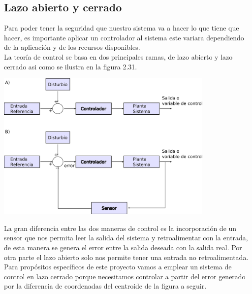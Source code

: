 
\subsection{Lazo abierto y cerrado}
Para poder tener la seguridad que nuestro sistema va a hacer lo que tiene que hacer, es importante
aplicar un controlador al sistema este variara dependiendo de la aplicación y de los recursos
disponibles.\\
La teoría de control se basa en dos principales ramas, de lazo abierto y lazo cerrado asi como se ilustra en la figura 2.31.
\begin{center}
	\includegraphics[width=0.8\textwidth]{Contenido/Cuerpo/Capitulo2/Fig21.eps}
	\label{fig:MarcoTeorico:Fig25}
\end{center}
La gran diferencia entre las dos maneras de control es la incorporación de un sensor que nos
permita leer la salida del sistema y retroalimentar con la entrada, de esta manera se genera
el error entre la salida deseada con la salida real. Por otra parte el lazo abierto solo nos permite
tener una entrada no retroalimentada.\\
Para propósitos específicos de este proyecto vamos a emplear un sistema de control en lazo cerrado
porque necesitamos controlar a partir del error generado por la diferencia de coordenadas del
centroide de la figura a seguir.

